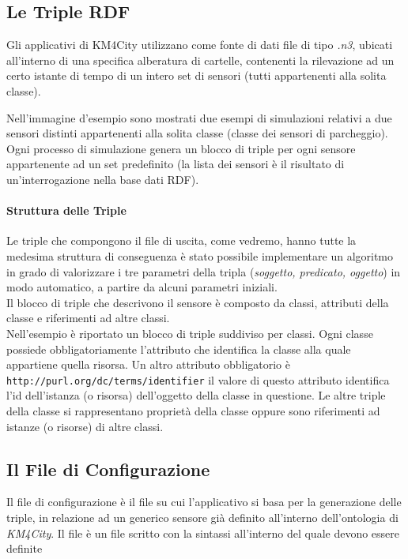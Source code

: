 \documentclass[12pt,a4paper,italian]{article}
\begin{document}
\subsection{Le Triple RDF}
Gli applicativi di KM4City utilizzano come fonte di dati file di tipo \emph{.n3}, ubicati all'interno di una specifica alberatura di cartelle, 
contenenti la rilevazione ad un certo istante di tempo di un intero set di sensori (tutti appartenenti alla solita classe).


Nell'immagine d'esempio sono mostrati due esempi di simulazioni relativi a due sensori distinti appartenenti alla solita classe (classe dei sensori di parcheggio). 
Ogni processo di simulazione genera un blocco di triple per ogni sensore appartenente ad un set predefinito (la lista dei sensori è il
risultato di un'interrogazione nella base dati RDF).
\paragraph{Struttura delle Triple}
Le triple che compongono il file di uscita, come vedremo, hanno tutte la medesima struttura di conseguenza è stato possibile implementare un algoritmo in grado di valorizzare
i tre parametri della tripla (\emph{soggetto, predicato, oggetto}) in modo automatico, a partire da alcuni parametri iniziali.\\
Il blocco di triple che descrivono il sensore è composto da classi, attributi della classe e riferimenti ad altre classi.\\
Nell'esempio è riportato un blocco di triple suddiviso per classi. Ogni classe possiede obbligatoriamente l'attributo  che identifica la classe alla quale appartiene quella risorsa.
Un altro attributo obbligatorio è \texttt{http://purl.org/dc/terms/identifier} il valore di questo attributo identifica l'id dell'istanza (o risorsa) dell'oggetto della classe in questione.
Le altre triple della classe si rappresentano proprietà della classe oppure sono riferimenti ad istanze (o risorse) di altre classi.

\subsection{Il File di Configurazione}
Il file di configurazione è il file su cui l'applicativo si basa per la generazione delle triple, in relazione ad un generico sensore già definito all'interno
dell'ontologia di \emph{KM4City}. Il file è un file scritto con la sintassi  all'interno del quale devono essere definite 
\end{document}
